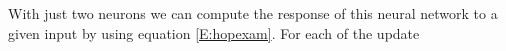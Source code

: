 %
%
   With just two neurons we can compute the response of this neural network to 
a given input by using equation \eqref{E:hopexam}.  For each of the update 
